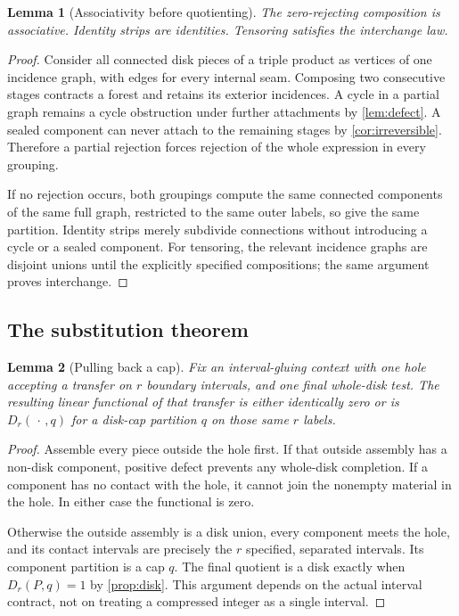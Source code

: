 \documentclass[11pt,a4paper]{article}
\newtheorem{lemma}[lemma]{Lemma}
\theoremstyle{definition}
\begin{document}
\begin{lemma}[Associativity before quotienting]\label{lem:assoc}
The zero-rejecting composition is associative. Identity strips are identities. Tensoring satisfies the interchange law.
\end{lemma}
\begin{proof}
Consider all connected disk pieces of a triple product as vertices of one incidence graph, with edges for every internal seam. Composing two consecutive stages contracts a forest and retains its exterior incidences. A cycle in a partial graph remains a cycle obstruction under further attachments by \cref{lem:defect}. A sealed component can never attach to the remaining stages by \cref{cor:irreversible}. Therefore a partial rejection forces rejection of the whole expression in every grouping.

If no rejection occurs, both groupings compute the same connected components of the same full graph, restricted to the same outer labels, so give the same partition. Identity strips merely subdivide connections without introducing a cycle or a sealed component. For tensoring, the relevant incidence graphs are disjoint unions until the explicitly specified compositions; the same argument proves interchange.
\end{proof}

\subsection{The substitution theorem}
\begin{lemma}[Pulling back a cap]\label{lem:pullback}
Fix an interval-gluing context with one hole accepting a transfer on $r$ boundary intervals, and one final whole-disk test. The resulting linear functional of that transfer is either identically zero or is $D_r(\,\cdot\,,q)$ for a disk-cap partition $q$ on those same $r$ labels.
\end{lemma}
\begin{proof}
Assemble every piece outside the hole first. If that outside assembly has a non-disk component, positive defect prevents any whole-disk completion. If a component has no contact with the hole, it cannot join the nonempty material in the hole. In either case the functional is zero.

Otherwise the outside assembly is a disk union, every component meets the hole, and its contact intervals are precisely the $r$ specified, separated intervals. Its component partition is a cap $q$. The final quotient is a disk exactly when $D_r(P,q)=1$ by \cref{prop:disk}. This argument depends on the actual interval contract, not on treating a compressed integer as a single interval.
\end{proof}
\end{document}
